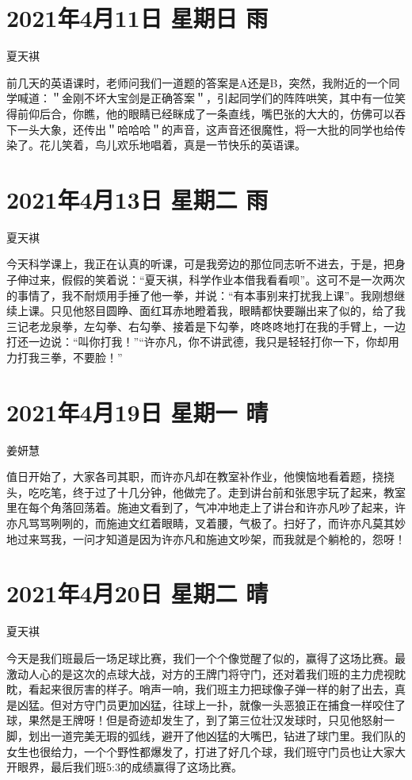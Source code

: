 \section{2021年4月11日 星期日 雨}

夏天褀

前几天的英语课时，老师问我们一道题的答案是A还是B，突然，我附近的一个同学喊道：＂金刚不坏大宝剑是正确答案＂，引起同学们的阵阵哄笑，其中有一位笑得前仰后合，你瞧，他的眼睛已经眯成了一条直线，嘴巴张的大大的，仿佛可以吞下一头大象，还传出＂哈哈哈＂的声音，这声音还很魔性，将一大批的同学也给传染了。花儿笑着，鸟儿欢乐地唱着，真是一节快乐的英语课。

\section{2021年4月13日 星期二 雨}

夏天褀

今天科学课上，我正在认真的听课，可是我旁边的那位同志听不进去，于是，把身子伸过来，假假的笑着说：``夏天褀，科学作业本借我看看呗''。这可不是一次两次的事情了，我不耐烦用手捶了他一拳，并说：``有本事别来打扰我上课''。我刚想继续上课。只见他怒目圆睁、面红耳赤地瞪着我，眼睛都快要蹦出来了似的，给了我三记老龙泉拳，左勾拳、右勾拳、接着是下勾拳，咚咚咚地打在我的手臂上，一边打还一边说：``叫你打我！''``许亦凡，你不讲武德，我只是轻轻打你一下，你却用力打我三拳，不要脸！''

\section{2021年4月19日 星期一 晴}

姜妍慧

值日开始了，大家各司其职，而许亦凡却在教室补作业，他懊恼地看着题，挠挠头，吃吃笔，终于过了十几分钟，他做完了。走到讲台前和张思宇玩了起来，教室里在每个角落回荡着。施迪文看到了，气冲冲地走上了讲台和许亦凡吵了起来，许亦凡骂骂咧咧的，而施迪文红着眼睛，叉着腰，气极了。扫好了，而许亦凡莫其妙地过来骂我，一问才知道是因为许亦凡和施迪文吵架，而我就是个躺枪的，怨呀！

\section{2021年4月20日 星期二 晴}

夏天褀

今天是我们班最后一场足球比赛，我们一个个像觉醒了似的，赢得了这场比赛。最激动人心的是这次的点球大战，对方的王牌门将守门，还对着我们班的主力虎视眈眈，看起来很厉害的样子。哨声一响，我们班主力把球像子弹一样的射了出去，真是凶猛。但对方守门员更加凶猛，往球上一扑，就像一头恶狼正在捕食一样咬住了球，果然是王牌呀！但是奇迹却发生了，到了第三位壮汉发球时，只见他怒射一脚，划出一道完美无瑕的弧线，避开了他凶猛的大嘴巴，钻进了球门里。我们队的女生也很给力，一个个野性都爆发了，打进了好几个球，我们班守门员也让大家大开眼界，最后我们班5:3的成绩赢得了这场比赛。

